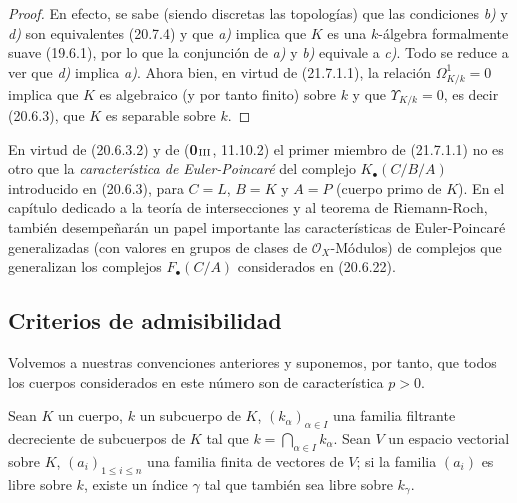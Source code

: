 \begin{proof}
En efecto, se sabe (siendo discretas las topologías) que las condiciones \emph{b)} y
\emph{d)} son equivalentes (20.7.4) y que \emph{a)} implica que $K$ es una $k$-álgebra
formalmente suave (19.6.1), por lo que la conjunción de \emph{a)} y \emph{b)} equivale a \emph{c)}.
Todo se reduce a ver que \emph{d)} implica \emph{a)}. Ahora bien, en virtud de (21.7.1.1),
la relación $\Omega^1_{K/k}=0$ implica que $K$ es algebraico (y por tanto finito)
sobre $k$ y que $\Upsilon_{K/k}=0$, es decir (20.6.3), que $K$ es separable
sobre $k$.
\end{proof}

\begin{remark}[21.7.5]
\label{0.21.7.5-fr}
En virtud de (20.6.3.2) y de (\textbf{0}$_{\rm III}$, 11.10.2) el primer miembro de
(21.7.1.1) no es otro que la \emph{característica de Euler-Poincaré} del
complejo $K_\bullet(C/B/A)$ introducido en (20.6.3), para $C=L$, $B=K$ y
$A=P$ (cuerpo primo de $K$). En el capítulo dedicado a la teoría de
intersecciones y al teorema de Riemann-Roch, también desempeñarán un papel
importante las características de Euler-Poincaré generalizadas (con valores
en grupos de clases de $\mathcal O_X$-Módulos) de complejos que generalizan
los complejos $F_\bullet(C/A)$ considerados en (20.6.22).
\end{remark}

\subsection{Criterios de admisibilidad}
\label{subsection:0.21.8-fr}

Volvemos a nuestras convenciones anteriores y suponemos, por tanto, que todos
los cuerpos considerados en este número son de característica $p>0$.

\begin{lemma}[21.8.1]
\label{0.21.8.1-fr}
Sean $K$ un cuerpo, $k$ un subcuerpo de $K$, $(k_\alpha)_{\alpha\in I}$ una
familia filtrante decreciente de subcuerpos de $K$ tal que
$k=\bigcap_{\alpha\in I}k_\alpha$. Sean $V$ un espacio vectorial sobre $K$,
$(a_i)_{1\leqslant i\leqslant n}$
 una familia finita de vectores de $V$; si la
familia $(a_i)$ es libre sobre $k$, existe un índice $\gamma$ tal que también
sea libre sobre $k_\gamma$.
\end{lemma}


